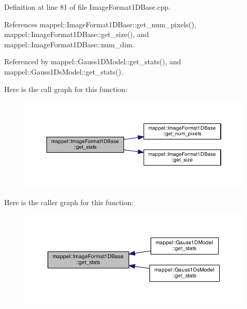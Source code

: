 Definition at line 81 of file Image\+Format1\+D\+Base.\+cpp.



References mappel\+::\+Image\+Format1\+D\+Base\+::get\+\_\+num\+\_\+pixels(), mappel\+::\+Image\+Format1\+D\+Base\+::get\+\_\+size(), and mappel\+::\+Image\+Format1\+D\+Base\+::num\+\_\+dim.



Referenced by mappel\+::\+Gauss1\+D\+Model\+::get\+\_\+stats(), and mappel\+::\+Gauss1\+Ds\+Model\+::get\+\_\+stats().



Here is the call graph for this function\+:\nopagebreak
\begin{figure}[H]
\begin{center}
\leavevmode
\includegraphics[width=350pt]{classmappel_1_1ImageFormat1DBase_ac6b74b16ce0a764516cc2686ee8cd60f_cgraph}
\end{center}
\end{figure}




Here is the caller graph for this function\+:\nopagebreak
\begin{figure}[H]
\begin{center}
\leavevmode
\includegraphics[width=350pt]{classmappel_1_1ImageFormat1DBase_ac6b74b16ce0a764516cc2686ee8cd60f_icgraph}
\end{center}
\end{figure}


